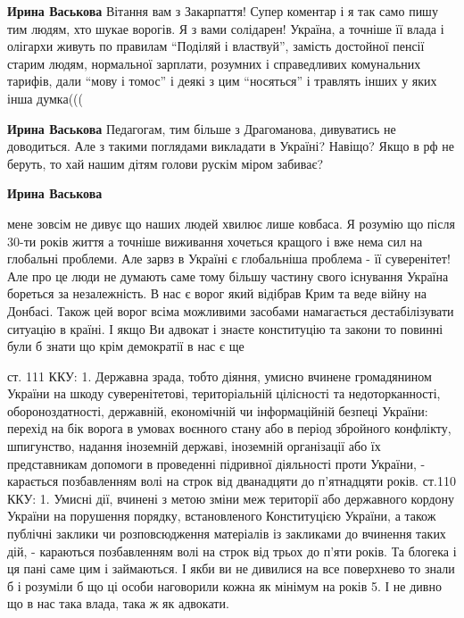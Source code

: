 \begin{itemize}

\textbf{Ирина Васькова} Вітання вам з Закарпаття! Супер коментар і я так само
пишу тим людям, хто шукае ворогів. Я з вами солідарен! Україна, а точніше її
влада і олігархи живуть по правилам \enquote{Поділяй і властвуй}, замість
достойної пенсії старим людям, нормальної зарплати, розумних і справедливих
комунальних тарифів, дали \enquote{мову і томос} і деякі з цим
\enquote{носяться} і травлять інших у яких інша думка(((


\textbf{Ирина Васькова} Педагогам, тим більше з Драгоманова, дивуватись не доводиться.
Але з такими поглядами викладати в Україні? Навіщо? Якщо в рф не беруть, то хай
нашим дітям голови рускім міром забиває?

\textbf{Ирина Васькова}

мене зовсім не дивує що наших людей хвилює лише ковбаса. Я розумію що після
30-ти років життя а точніше виживання хочеться кращого і вже нема сил на
глобальні проблеми. Але зарвз в Україні є глобальніша проблема - її
суверенітет! Але про це люди не думають саме тому більшу частину свого
існування Україна бореться за незалежність. В нас є ворог який відібрав Крим та
веде війну на Донбасі. Також цей ворог всіма можливими засобами намагається
дестабілізувати ситуацію в країні. І якщо Ви адвокат і знаєте конституцію та
закони то повинні були б знати що крім демократії в нас є ще

\obeycr
ст. 111 ККУ:
1. Державна зрада, тобто діяння, умисно вчинене громадянином України на шкоду суверенітетові, територіальній цілісності та недоторканності, обороноздатності, державній, економічній чи інформаційній безпеці України: перехід на бік ворога в умовах воєнного стану або в період збройного конфлікту, шпигунство, надання іноземній державі, іноземній організації або їх представникам допомоги в проведенні підривної діяльності проти України, - карається позбавленням волі на строк від дванадцяти до п'ятнадцяти років.
ст.110 ККУ:
1. Умисні дії, вчинені з метою зміни меж території або державного кордону України на порушення порядку, встановленого Конституцією України, а також публічні заклики чи розповсюдження матеріалів із закликами до вчинення таких дій, -
караються позбавленням волі на строк від трьох до п'яти років.
Та блогека і ця пані саме цим і займаються.
І якби ви не дивилися на все поверхнево то знали б і розуміли б що ці особи наговорили кожна як мінімум на років 5.
І не дивно що в нас така влада, така ж як адвокати.
\restorecr


\end{itemize}
